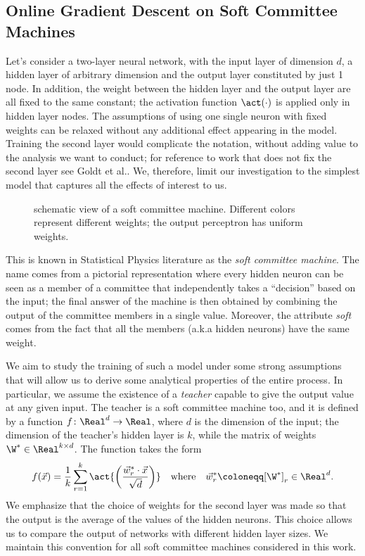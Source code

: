 \subsection{Online Gradient Descent on Soft Committee Machines}
Let's consider a two-layer neural network, with the input layer of dimension \(d\),
a hidden layer of arbitrary dimension and the output layer constituted by just 1 node.
In addition, the weight between the hidden layer and the output layer are all fixed 
to the same constant; the activation function \(\act(\cdot)\) is applied only in hidden layer nodes.
The assumptions of using one single neuron with fixed weights can be relaxed without any additional effect appearing in the model.
Training the second layer would complicate the notation, without adding value to the analysis we want to conduct;
for reference to work that does not fix the second layer see Goldt et al.\cite{goldt2019dynamics}.
We, therefore, limit our investigation to the simplest model that captures all the effects of interest to us.
\begin{figure}
  \centering
  \begin{tikzpicture}[x=1.5cm, y=1.2cm, >=latex]
    
  \end{tikzpicture}
  \caption{ schematic view of a soft committee machine.
            Different colors represent different weights; the output perceptron has uniform weights.}
\end{figure}
This is known in Statistical Physics literature as the \emph{soft
committee machine}. The name comes from a pictorial representation where every hidden neuron can be seen 
as a member of a committee that independently takes a ``decision'' based on the input;
the final answer of the machine is then obtained by combining the output of the committee
members in a single value. Moreover, the attribute \emph{soft} comes from the fact
that all the members (a.k.a hidden neurons) have the same weight.

We aim to study the training of such a model under some strong assumptions that will
allow us to derive some analytical properties of the entire process.
In particular, we assume the existence of a \emph{teacher} capable to give the output
value at any given input. The teacher is a soft committee machine too, and it is defined 
by a function \(f\colon \Real^d\to\Real\), where \(d\) is the dimension
of the input; the dimension of the teacher's hidden layer is \(k\),
while the matrix of weights \(\W^* \in \Real^{k\times d}\).
The function takes the form
\[
  f{(\vec{x})} = \frac{1}{k}\sum_{r=1}^{k} \act{\left(\frac{\vec{w}^*_r \cdot \vec{x}}{\sqrt{d}}\right)}
  \quad\text{where}\quad \vec{w}^*_r \coloneqq [\W^*]_r \in \Real^d. 
\]
We emphasize that the choice of weights for the second layer was made so that
the output is the average of the values of the hidden neurons. This choice allows
us to compare the output of networks with different hidden layer sizes.
We maintain this convention for all soft committee machines considered in this work.


